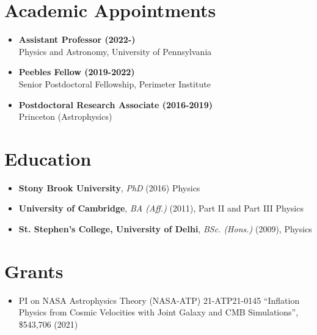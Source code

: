 \documentclass[11pt,margin]{res}
\begin{document}
\begin{resume}


\section{Academic Appointments}
\begin{itemize}
\item \textbf{Assistant Professor (2022-)} \\
  Physics and Astronomy, University of Pennsylvania
\item \textbf{Peebles Fellow (2019-2022)} \\
  Senior Postdoctoral Fellowship, Perimeter Institute
\item \textbf{Postdoctoral Research Associate (2016-2019)} \\
  Princeton (Astrophysics)
  \end{itemize}


\section{Education}
\begin{itemize}
\item \textbf{Stony Brook University}, {\sl PhD} (2016)  Physics
\item \textbf{University of Cambridge}, {\sl BA (Aff.)} (2011), Part II and Part III Physics
\item \textbf{St. Stephen's College, University of Delhi}, {\sl BSc. (Hons.)} (2009), Physics
  \end{itemize}



\section{Grants}
\par
\begin{itemize}
\item PI on NASA Astrophysics Theory (NASA-ATP) 21-ATP21-0145 ``Inflation Physics from Cosmic Velocities with Joint Galaxy and CMB Simulations'', \$543,706 (2021)
\end{itemize}


\end{resume}
\end{document}
